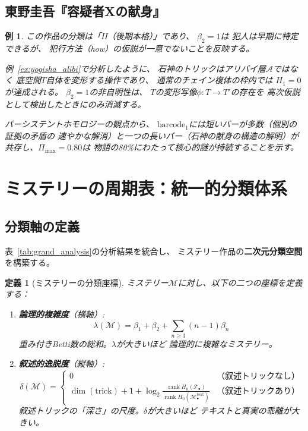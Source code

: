 \documentclass[12pt,twocolumn]{ltjsarticle}
\newtheorem{definition}[theorem]{定義}
\newtheorem{example}[theorem]{例}
\renewcommand{\rank}{\operatorname{rank}}
\newcommand{\Mys}{\mathcal{M}}
\newcommand{\barcode}{\mathrm{barcode}}
\begin{document}
\subsection{東野圭吾『容疑者Xの献身』}

\begin{example}
この作品の分類は「II（後期本格）」であり、
$\beta_2 = 1$は
\emph{犯人は早期に特定できるが、
犯行方法（how）の仮説が一意でない}ことを反映する。

例~\ref{ex:yogisha_alibi}で分析したように、
石神のトリックはアリバイ層$\mathcal{A}$ではなく
底空間$T$自体を変形する操作であり、
通常のチェイン複体の枠内では
$H_1 = 0$が達成される。
$\beta_2 = 1$の非自明性は、
$T$の変形写像$\phi: T \to T'$の存在を
高次仮説として検出したときにのみ消滅する。

パーシステントホモロジーの観点から、
$\barcode_1$には短いバーが多数（個別の証拠の矛盾の
速やかな解消）と一つの長いバー（石神の献身の構造の解明）が
共存し、$\Pi_{\max} = 0.80$は
物語の80\%にわたって核心的謎が持続することを示す。
\end{example}


\section{ミステリーの周期表：統一的分類体系}
\label{sec:grand_taxonomy}

\subsection{分類軸の定義}

表~\ref{tab:grand_analysis}の分析結果を統合し、
ミステリー作品の\textbf{二次元分類空間}を構築する。

\begin{definition}[ミステリーの分類座標]
ミステリー$\Mys$に対し、以下の二つの座標を定義する：
\begin{enumerate}
\item \textbf{論理的複雑度}（横軸）:
\begin{equation}
\lambda(\Mys) = \beta_1 + \beta_2
+ \sum_{n \geq 3} (n-1) \beta_n
\end{equation}
重み付きBetti数の総和。$\lambda$が大きいほど
論理的に複雑なミステリー。

\item \textbf{叙述的逸脱度}（縦軸）:
\begin{equation}
\delta(\Mys) = \begin{cases}
0 & \text{（叙述トリックなし）} \\
\dim(\text{trick}) + 1 +
\log_2 \frac{\rank H_0(\mathcal{T}_\bullet)}
{\rank H_0(\Mys^{\text{text}}_\bullet)} &
\text{（叙述トリックあり）}
\end{cases}
\end{equation}
叙述トリックの「深さ」の尺度。$\delta$が大きいほど
テキストと真実の乖離が大きい。
\end{enumerate}
\end{definition}
\end{document}
